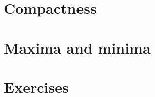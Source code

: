 \documentclass[12 pt]{article}
\numberwithin{equation}{section}
\begin{document}
{\section{Compactness}

















\section{Maxima and minima}
















\section{Exercises}



}
\end{document}
